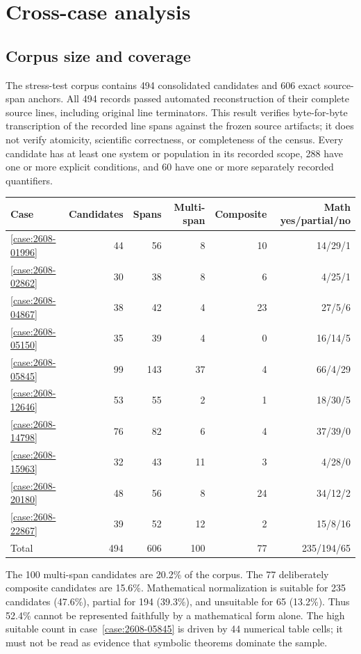 \section{Cross-case analysis}\label{sec:cross-case}

\subsection{Corpus size and coverage}

The stress-test corpus contains 494 consolidated candidates and 606 exact source-span anchors. All 494 records passed automated reconstruction of their complete source lines, including original line terminators. This result verifies byte-for-byte transcription of the recorded line spans against the frozen source artifacts; it does not verify atomicity, scientific correctness, or completeness of the census. Every candidate has at least one system or population in its recorded scope, 288 have one or more explicit conditions, and 60 have one or more separately recorded quantifiers.

\begin{center}
\small
\begin{tabular}{lrrrrr}
\toprule
Case & Candidates & Spans & Multi-span & Composite & Math yes/partial/no \\
\midrule
\ref{case:2608-01996} & 44 & 56 & 8 & 10 & 14/29/1 \\
\ref{case:2608-02862} & 30 & 38 & 8 & 6 & 4/25/1 \\
\ref{case:2608-04867} & 38 & 42 & 4 & 23 & 27/5/6 \\
\ref{case:2608-05150} & 35 & 39 & 4 & 0 & 16/14/5 \\
\ref{case:2608-05845} & 99 & 143 & 37 & 4 & 66/4/29 \\
\ref{case:2608-12646} & 53 & 55 & 2 & 1 & 18/30/5 \\
\ref{case:2608-14798} & 76 & 82 & 6 & 4 & 37/39/0 \\
\ref{case:2608-15963} & 32 & 43 & 11 & 3 & 4/28/0 \\
\ref{case:2608-20180} & 48 & 56 & 8 & 24 & 34/12/2 \\
\ref{case:2608-22867} & 39 & 52 & 12 & 2 & 15/8/16 \\
\midrule
Total & 494 & 606 & 100 & 77 & 235/194/65 \\
\bottomrule
\end{tabular}
\end{center}

The 100 multi-span candidates are 20.2\% of the corpus. The 77 deliberately composite candidates are 15.6\%. Mathematical normalization is suitable for 235 candidates (47.6\%), partial for 194 (39.3\%), and unsuitable for 65 (13.2\%). Thus 52.4\% cannot be represented faithfully by a mathematical form alone. The high suitable count in case~\ref{case:2608-05845} is driven by 44 numerical table cells; it must not be read as evidence that symbolic theorems dominate the sample.

